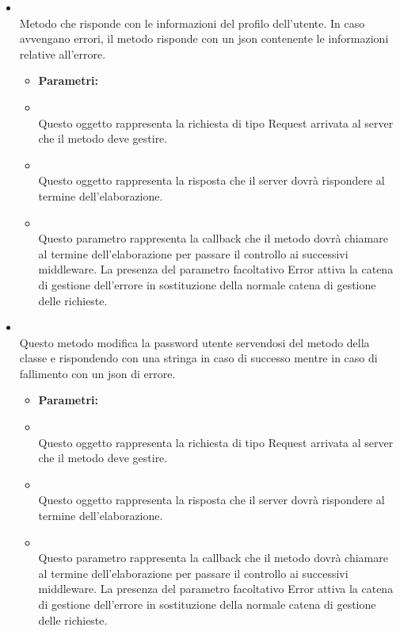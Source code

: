 \begin{itemize}
\begin{itemize}
				\end{itemize}
					\item[] \textbf{} \\ Metodo che risponde con le informazioni del profilo dell'utente. In caso avvengano errori, il metodo risponde con un json contenente le informazioni relative all'errore.
						\begin{itemize}\addtolength{\itemsep}{-0.5\baselineskip}
						\item[] \textbf{Parametri:}
						\item[]  \\ Questo oggetto rappresenta la richiesta di tipo Request arrivata al server che il metodo deve gestire.	
						\item[]  \\ Questo oggetto rappresenta la risposta che il server dovrà rispondere al termine dell'elaborazione.	
						\item[]  \\ Questo parametro rappresenta la callback che il metodo dovrà chiamare al termine dell'elaborazione per passare il controllo ai successivi middleware. La presenza del parametro facoltativo Error attiva la catena di gestione dell'errore in sostituzione della normale catena di gestione delle richieste.	
				\end{itemize}
					\item[] \textbf{} \\ Questo metodo modifica la password utente servendosi del metodo  della classe  e rispondendo con una stringa in caso di successo mentre in caso di fallimento con un json di errore.
						\begin{itemize}\addtolength{\itemsep}{-0.5\baselineskip}
						\item[] \textbf{Parametri:}
						\item[]  \\ Questo oggetto rappresenta la richiesta di tipo Request arrivata al server che il metodo deve gestire.	
						\item[]  \\ Questo oggetto rappresenta la risposta che il server dovrà rispondere al termine dell'elaborazione.	
						\item[]  \\ Questo parametro rappresenta la callback che il metodo dovrà chiamare al termine dell'elaborazione per passare il controllo ai successivi middleware. La presenza del parametro facoltativo Error attiva la catena di gestione dell'errore in sostituzione della normale catena di gestione delle richieste.	
				\end{itemize}
		\end{itemize}
